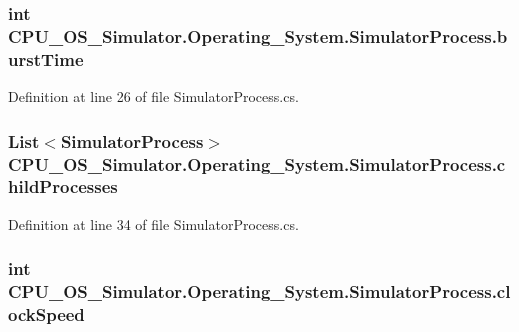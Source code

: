 \subsubsection[{burst\+Time}]{\setlength{\rightskip}{0pt plus 5cm}int C\+P\+U\+\_\+\+O\+S\+\_\+\+Simulator.\+Operating\+\_\+\+System.\+Simulator\+Process.\+burst\+Time\hspace{0.3cm}{\ttfamily [private]}}\label{class_c_p_u___o_s___simulator_1_1_operating___system_1_1_simulator_process_aaa8160807178efd2cb70364dc48a8c70}


Definition at line 26 of file Simulator\+Process.\+cs.

\hypertarget{class_c_p_u___o_s___simulator_1_1_operating___system_1_1_simulator_process_a72edfc38a41a74a935147ea8039ea49c}{}
\subsubsection[{child\+Processes}]{\setlength{\rightskip}{0pt plus 5cm}List$<${\bf Simulator\+Process}$>$ C\+P\+U\+\_\+\+O\+S\+\_\+\+Simulator.\+Operating\+\_\+\+System.\+Simulator\+Process.\+child\+Processes\hspace{0.3cm}{\ttfamily [private]}}\label{class_c_p_u___o_s___simulator_1_1_operating___system_1_1_simulator_process_a72edfc38a41a74a935147ea8039ea49c}


Definition at line 34 of file Simulator\+Process.\+cs.

\hypertarget{class_c_p_u___o_s___simulator_1_1_operating___system_1_1_simulator_process_acb5b4680ab904693eb4b519c9f5e5e6e}{}
\subsubsection[{clock\+Speed}]{\setlength{\rightskip}{0pt plus 5cm}int C\+P\+U\+\_\+\+O\+S\+\_\+\+Simulator.\+Operating\+\_\+\+System.\+Simulator\+Process.\+clock\+Speed\hspace{0.3cm}{\ttfamily [private]}}\label{class_c_p_u___o_s___simulator_1_1_operating___system_1_1_simulator_process_acb5b4680ab904693eb4b519c9f5e5e6e}


